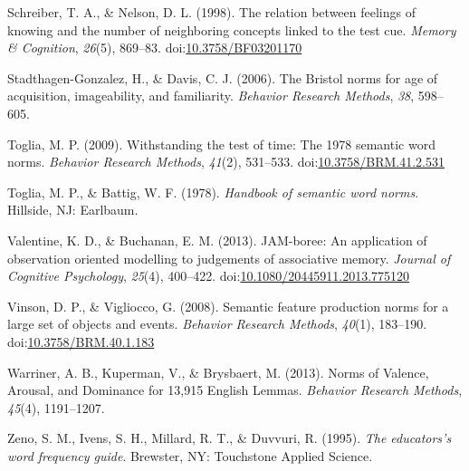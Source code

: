 \documentclass[english,man]{apa6}
\theoremstyle{definition}
\theoremstyle{definition}
\theoremstyle{definition}
\theoremstyle{remark}
\begin{document}
\hypertarget{ref-Schreiber1998}{}
Schreiber, T. A., \& Nelson, D. L. (1998). The relation between feelings
of knowing and the number of neighboring concepts linked to the test
cue. \emph{Memory \& Cognition}, \emph{26}(5), 869--83.
doi:\href{https://doi.org/10.3758/BF03201170}{10.3758/BF03201170}

\hypertarget{ref-Stadthagen-Gonzalez2006}{}
Stadthagen-Gonzalez, H., \& Davis, C. J. (2006). The Bristol norms for
age of acquisition, imageability, and familiarity. \emph{Behavior
Research Methods}, \emph{38}, 598--605.

\hypertarget{ref-Toglia2009}{}
Toglia, M. P. (2009). Withstanding the test of time: The 1978 semantic
word norms. \emph{Behavior Research Methods}, \emph{41}(2), 531--533.
doi:\href{https://doi.org/10.3758/BRM.41.2.531}{10.3758/BRM.41.2.531}

\hypertarget{ref-Toglia1978}{}
Toglia, M. P., \& Battig, W. F. (1978). \emph{Handbook of semantic word
norms}. Hillside, NJ: Earlbaum.

\hypertarget{ref-Valentine2013}{}
Valentine, K. D., \& Buchanan, E. M. (2013). JAM-boree: An application
of observation oriented modelling to judgements of associative memory.
\emph{Journal of Cognitive Psychology}, \emph{25}(4), 400--422.
doi:\href{https://doi.org/10.1080/20445911.2013.775120}{10.1080/20445911.2013.775120}

\hypertarget{ref-Vinson2008}{}
Vinson, D. P., \& Vigliocco, G. (2008). Semantic feature production
norms for a large set of objects and events. \emph{Behavior Research
Methods}, \emph{40}(1), 183--190.
doi:\href{https://doi.org/10.3758/BRM.40.1.183}{10.3758/BRM.40.1.183}

\hypertarget{ref-Warriner2013}{}
Warriner, A. B., Kuperman, V., \& Brysbaert, M. (2013). Norms of
Valence, Arousal, and Dominance for 13,915 English Lemmas.
\emph{Behavior Research Methods}, \emph{45}(4), 1191--1207.

\hypertarget{ref-Zeno1995}{}
Zeno, S. M., Ivens, S. H., Millard, R. T., \& Duvvuri, R. (1995).
\emph{The educators's word frequency guide}. Brewster, NY: Touchstone
Applied Science.
\end{document}
